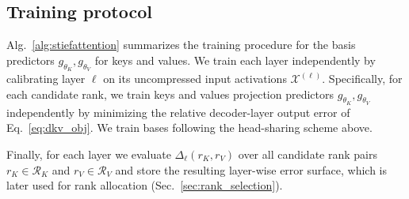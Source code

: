\subsection{Training protocol}
Alg.~\ref{alg:stiefattention} summarizes the \methodname training procedure for the basis predictors $g_{\theta_K}, g_{\theta_V}$ for keys and values.
We train each layer independently by calibrating layer $\ell$ on its uncompressed input activations $\mathcal{X}^{(\ell)}$.
Specifically, for each candidate rank, we train keys and values projection predictors $g_{\theta_K}, g_{\theta_V}$ independently by minimizing the relative decoder-layer output error of Eq.~\ref{eq:dkv_obj}.
We train bases following the head-sharing scheme above.

Finally, for each layer we evaluate $\Delta_\ell(r_K,r_V)$ over all candidate rank pairs $r_K \in \mathcal{R}_K$ and $r_V\in \mathcal{R}_V$ and store the resulting layer-wise error surface, which is later used for rank allocation (Sec.~\ref{sec:rank_selection}).


